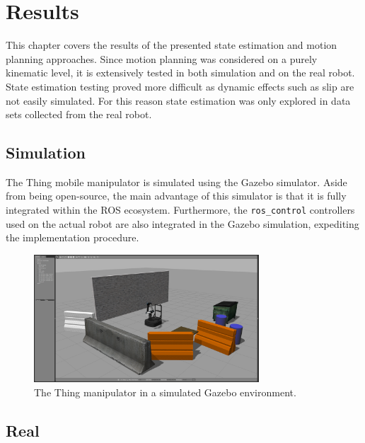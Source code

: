 \documentclass[times, utf8, diplomski, english]{fer}
\begin{document}
\chapter{Results}
This chapter covers the results of the presented state estimation and motion planning approaches.
Since motion planning was considered on a purely kinematic level, it is extensively tested in both simulation and on the real robot.
State estimation testing proved more difficult as dynamic effects such as slip are not easily simulated.
For this reason state estimation was only explored in data sets collected from the real robot.
\section{Simulation}
The Thing mobile manipulator is simulated using the Gazebo simulator.
Aside from being open-source, the main advantage of this simulator is that it is fully integrated within the ROS ecosystem.
Furthermore, the \verb|ros_control| controllers used on the actual robot are also integrated in the Gazebo simulation, expediting the implementation procedure.
\begin{figure}[h]
\centering
 \includegraphics[width=0.75\textwidth, clip = 0cm 0cm 0cm 0cm]{gazebo_screenshot1}
 \caption{The Thing manipulator in a simulated Gazebo environment.}
\end{figure}

\section{Real}
\end{document}
